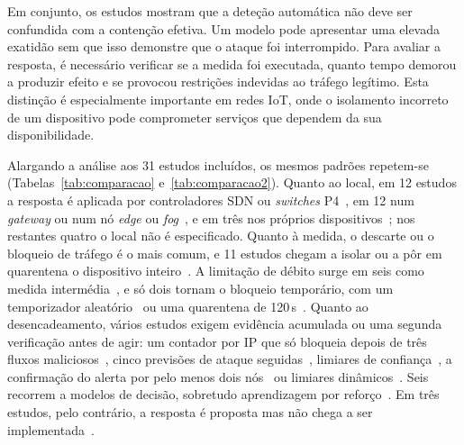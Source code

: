 \documentclass[conference,a4paper]{IEEEtran}
\begin{document}
Em conjunto, os estudos mostram que a deteção automática não deve ser confundida com a contenção efetiva. Um modelo pode apresentar uma elevada exatidão sem que isso demonstre que o ataque foi interrompido. Para avaliar a resposta, é necessário verificar se a medida foi executada, quanto tempo demorou a produzir efeito e se provocou restrições indevidas ao tráfego legítimo. Esta distinção é especialmente importante em redes IoT, onde o isolamento incorreto de um dispositivo pode comprometer serviços que dependem da sua disponibilidade.

Alargando a análise aos 31 estudos incluídos, os mesmos padrões repetem-se
(Tabelas~\ref{tab:comparacao} e~\ref{tab:comparacao2}). Quanto ao local, em 12 estudos a
resposta é aplicada por controladores SDN ou \textit{switches}
P4~\cite{ramirezmartinez2025p4,andrade2024ddos,elsayed2024mpguard,zolotukhin2021curious,tawfik2021internet,Iqbal2026,Chaudhary2025,toony2024multiblock,gowtham2026fedmp,mazhar2022ridps,garba2024sdn,karibandi2025cyberdome},
em 12 num \textit{gateway} ou num nó \textit{edge} ou
\textit{fog}~\cite{rose2022ideres,ravi2020semisupervised,ibrahim2026purechain,dange2025dual,karam2025isaaf,srilekha2025hybrid,hussain2026postquantum,kumar2025advanced,tariq2025saegru,Abdulwahid2025,Arulkumar2026,verma2024petrak},
e em três nos próprios
dispositivos~\cite{kponyo2020lightweight,premakumari2025qlearning,hunde2026rankshield}; nos
restantes quatro o local não é especificado. Quanto à medida, o descarte ou o bloqueio de tráfego é o mais comum, e 11
estudos chegam a isolar ou a pôr em quarentena o dispositivo
inteiro~\cite{rose2022ideres,ibrahim2026purechain,dange2025dual,Iqbal2026,toony2024multiblock,srilekha2025hybrid,hussain2026postquantum,tariq2025saegru,karibandi2025cyberdome,hunde2026rankshield,shukla2026cyber}.
A limitação de débito surge em seis como medida
intermédia~\cite{elsayed2024mpguard,ibrahim2026purechain,srilekha2025hybrid,gowtham2026fedmp,kumar2025advanced,karibandi2025cyberdome},
e só dois tornam o bloqueio temporário, com um temporizador
aleatório~\cite{ravi2020semisupervised} ou uma quarentena de
120\,s~\cite{ibrahim2026purechain}. Quanto ao desencadeamento, vários estudos exigem
evidência acumulada ou uma segunda verificação antes de agir: um contador por IP que só
bloqueia depois de três fluxos maliciosos~\cite{ramirezmartinez2025p4}, cinco previsões
de ataque seguidas~\cite{andrade2024ddos}, limiares de
confiança~\cite{ibrahim2026purechain,gowtham2026fedmp,hussain2026postquantum}, a
confirmação do alerta por pelo menos dois nós~\cite{srilekha2025hybrid} ou limiares
dinâmicos~\cite{hunde2026rankshield}. Seis recorrem a modelos de decisão, sobretudo
aprendizagem por
reforço~\cite{rose2022ideres,zolotukhin2021curious,gowtham2026fedmp,premakumari2025qlearning,kumar2025advanced,Arulkumar2026}.
Em três estudos, pelo contrário, a resposta é proposta mas não chega a ser
implementada~\cite{rawat2024intelligent,hussain2026postquantum,kumar2025advanced}.
\end{document}
